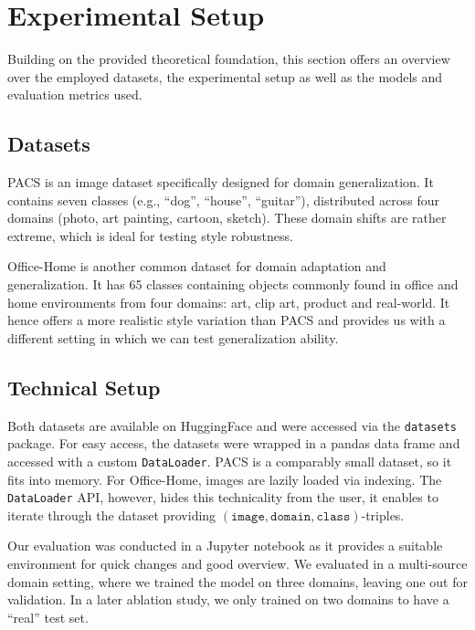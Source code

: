 \section{Experimental Setup}\label{sec:setup}

Building on the provided theoretical foundation, this section offers an overview over the employed datasets, the experimental setup as well as the models and evaluation metrics used.

\subsection{Datasets}

PACS \citep{pacs_ref} is an image dataset specifically designed for domain generalization. It contains seven classes (e.g., ``dog'', ``house'', ``guitar''), distributed across four domains (photo, art painting, cartoon, sketch). These domain shifts are rather extreme, which is ideal for testing style robustness.

Office-Home \citep{office-home_ref} is another common dataset for domain adaptation and generalization. It has 65 classes containing objects commonly found in office and home environments from four domains: art, clip art, product and real-world. It hence offers a more realistic style variation than PACS and provides us with a different setting in which we can test generalization ability.

\subsection{Technical Setup}

Both datasets are available on HuggingFace and were accessed via the \lstinline|datasets| package. For easy access, the datasets were wrapped in a pandas data frame and accessed with a custom \lstinline|DataLoader|. PACS is a comparably small dataset, so it fits into memory. For Office-Home, images are lazily loaded via indexing. The \lstinline|DataLoader| API, however, hides this technicality from the user, it enables to iterate through the dataset providing $(\mathtt{image}, \mathtt{domain}, \mathtt{class})$-triples.

Our evaluation was conducted in a Jupyter notebook as it provides a suitable environment for quick changes and good overview. We evaluated in a multi-source domain setting, where we trained the model on three domains, leaving one out for validation. In a later ablation study, we only trained on two domains to have a ``real'' test set.

